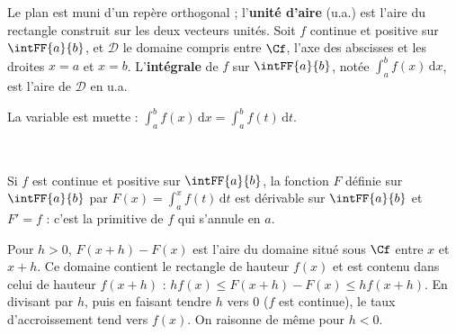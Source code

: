 \noindent
\begin{minipage}[c]{0.56\linewidth}
\begin{definition}
\raggedright
Le plan est muni d'un repère orthogonal ; l'\textbf{unité d'aire} (u.a.) est l'aire du rectangle construit sur les deux
vecteurs unités. Soit $f$ continue et positive sur $\intFF{a}{b}$, et $\mathcal{D}$ le domaine compris entre $\Cf$, l'axe des
abscisses et les droites $x=a$ et $x=b$. L'\textbf{intégrale} de $f$ sur $\intFF{a}{b}$, notée
$\displaystyle\int_a^b f(x)\,\mathrm{d}x$, est l'aire de $\mathcal{D}$ en u.a.
\end{definition}
{\small\color{otMuted}La variable est muette : $\int_a^bf(x)\,\mathrm{d}x=\int_a^bf(t)\,\mathrm{d}t$.}
\end{minipage}\hfill
\begin{minipage}[c]{0.4\linewidth}
\centering
{}\\[0.5mm]
\end{minipage}

\begin{theoreme}
Si $f$ est continue et positive sur $\intFF{a}{b}$, la fonction $F$ définie sur $\intFF{a}{b}$ par $F(x)=\displaystyle\int_a^x f(t)\,\mathrm{d}t$
est dérivable sur $\intFF{a}{b}$ et $F'=f$ : c'est la primitive de $f$ qui s'annule en $a$.
\end{theoreme}

\begin{demonstration}
Pour $h>0$, $F(x+h)-F(x)$ est l'aire du domaine situé sous $\Cf$ entre $x$ et $x+h$. Ce domaine contient le rectangle de
hauteur $f(x)$ et est contenu dans celui de hauteur $f(x+h)$ : $hf(x)\leq F(x+h)-F(x)\leq hf(x+h)$. En divisant par $h$, puis
en faisant tendre $h$ vers $0$ ($f$ est continue), le taux d'accroissement tend vers $f(x)$. On raisonne de même pour $h<0$.
\end{demonstration}

